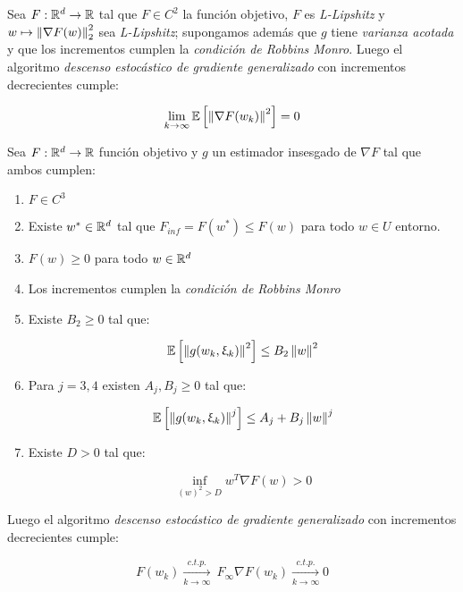 \begin{theorem}
	Sea $F: {\mathbb{R}}^d \rightarrow {\mathbb{R}}$ tal que $F \in C^2$ la funci\'on objetivo, $F$ es \textit{L-Lipshitz} y $w \mapsto \left\lVert\nabla F (w)\right\rVert_2^2$ sea \textit{L-Lipshitz}; supongamos adem\'as que $g$ tiene \textit{varianza acotada} y que los incrementos cumplen la \textit{condici\'on de Robbins Monro}. Luego el algoritmo \textit{descenso estoc\'astico de gradiente generalizado} con incrementos decrecientes cumple:
	
	\begin{equation*}
	\lim\limits_{k \rightarrow \infty} \mathbb{E} \left[\left\lVert\nabla F (w_k)\right\rVert^2\right] = 0
	\end{equation*}
	
\end{theorem}

\begin{theorem}
	Sea $F: {\mathbb{R}}^d \rightarrow {\mathbb{R}}$  funci\'on objetivo y  $g$ un estimador insesgado de $\nabla F$ tal que ambos cumplen:
	
		\begin{enumerate}
		\item $F \in C^3$
		\item Existe $w^* \in {\mathbb{R}}^d$ tal que $F_{inf} = F(w^*) \leq F(w)$ para todo $w \in U$ entorno.
		\item $F(w) \geq 0$ para todo $w \in {\mathbb{R}}^d$
		\item Los incrementos cumplen la \textit{condici\'on de Robbins Monro}
		\item Existe $B_2 \geq 0$ tal que:
		
		\begin{equation*}
		\mathbb{E} \left[\left\lVert g(w_k, \upxi_{k})\right\rVert^2\right] \leq B_2 \left\lVert w\right\rVert^2
		\end{equation*}		
		
		\item Para $j=3, 4$ existen $A_j,B_j \geq 0$ tal que:
		
		\begin{equation*}
		\mathbb{E} \left[\left\lVert g(w_k, \upxi_{k})\right\rVert^j\right] \leq A_j + B_j \left\lVert w\right\rVert^j
		\end{equation*}
		
		\item  Existe $D > 0$ tal que:
		
		\begin{equation*}
		\inf\limits_{(w)^2 > D} {w^T \nabla F(w)} >0
		\end{equation*}
	\end{enumerate}
	
	
	Luego el algoritmo \textit{descenso estoc\'astico de gradiente generalizado} con incrementos decrecientes cumple:
	
	\begin{subequations}
		\begin{equation*}
		F(w_k) \xrightarrow[k \rightarrow \infty]{c.t.p.} \ F_{\infty}
		\end{equation*}
		\begin{equation*}
		\nabla F(w_k) \xrightarrow[k \rightarrow \infty]{c.t.p.} 0
		\end{equation*}
	\end{subequations}
	
\end{theorem}